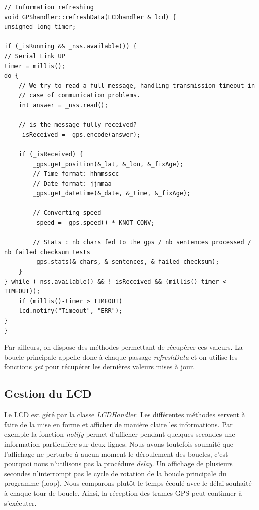 \documentclass[a4paper,12pt,titlepage]{article}
\begin{document}
\begin{lstlisting}[caption={resfreshData},label={refreshData}]
// Information refreshing
void GPShandler::refreshData(LCDhandler & lcd) {
unsigned long timer;

if (_isRunning && _nss.available()) {
// Serial Link UP
timer = millis();
do {
    // We try to read a full message, handling transmission timeout in
    // case of communication problems.
    int answer = _nss.read();

    // is the message fully received?
    _isReceived = _gps.encode(answer);

    if (_isReceived) {
        _gps.get_position(&_lat, &_lon, &_fixAge);
        // Time format: hhmmsscc
        // Date format: jjmmaa
        _gps.get_datetime(&_date, &_time, &_fixAge);

        // Converting speed
        _speed = _gps.speed() * KNOT_CONV;

        // Stats : nb chars fed to the gps / nb sentences processed / nb failed checksum tests
        _gps.stats(&_chars, &_sentences, &_failed_checksum);
    }
} while (_nss.available() && !_isReceived && (millis()-timer < TIMEOUT));
    if (millis()-timer > TIMEOUT)
    lcd.notify("Timeout", "ERR");
}
}
\end{lstlisting}

Par ailleurs, on dispose des méthodes permettant de récupérer ces valeurs. La
boucle principale appelle donc à chaque passage \emph{refreshData} et on
utilise les fonctions \emph{get} pour récupérer les dernières valeurs mises à
jour.

\subsection{Gestion du LCD}

Le LCD est géré par la classe \emph{LCDHandler}. Les différentes méthodes
servent à faire de la mise en forme et afficher de manière claire les
informations. Par exemple la fonction \emph{notify} permet d'afficher pendant
quelques secondes une information particulière sur deux lignes. Nous avons
toutefois souhaité que l'affichage ne perturbe à aucun moment le déroulement
des boucles, c'est pourquoi nous n'utilisons pas la procédure \emph{delay}.
Un affichage de plusieurs secondes n'interrompt pas le cycle de rotation de
la boucle principale du programme (loop). Nous comparons plutôt le temps écoulé
avec le délai souhaité à chaque tour de boucle. Ainsi, la réception des trames
GPS peut continuer à s'exécuter.
\end{document}
